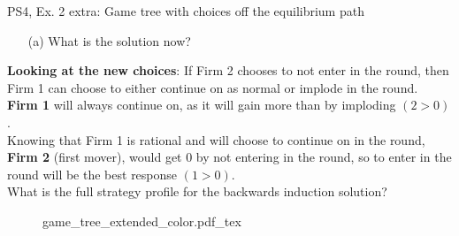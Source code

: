 \begin{frame}{PS4, Ex. 2 extra: Game tree with choices off the equilibrium path}
  \begin{multicols}{2}
    \begin{itemize}
      \item[(a)] What is the solution now?
    \end{itemize}
    \textbf{Looking at the new choices}: If Firm 2 chooses to not enter in the  round, then Firm 1 can choose to either continue on as normal or implode in the  round.\\\medskip
    \textbf{Firm 1} will always continue on, as it will gain more than by imploding $(2>0)$.\\\medskip
    Knowing that Firm 1 is rational and will choose to continue on in the  round, \textbf{Firm 2} (first mover), would get 0 by not entering in the  round, so to enter in the  round will be the best response $(1>0)$.\\\medskip
    What is the full strategy profile for the backwards induction solution?
  
  \vfill\null \columnbreak
    \begin{figure}[!h]
      \begin{center}
      \def\svgwidth{1.0\columnwidth}
      {game_tree_extended_color.pdf_tex}
      \end{center}
    \end{figure}
  \vfill\null
  \end{multicols}
\end{frame}
